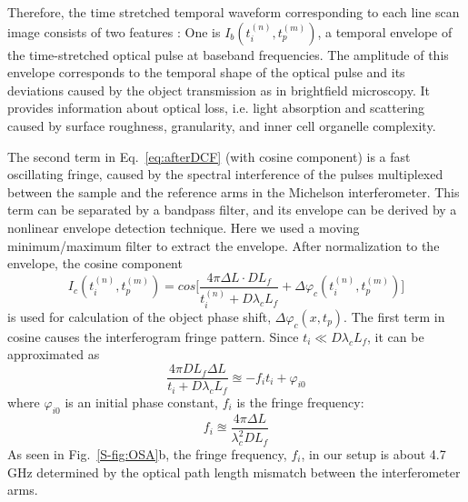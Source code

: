 \documentclass[aps,pra,reprint,longbibliography,superscriptaddress]{revtex4-1}
\begin{document}
Therefore, the time stretched temporal waveform corresponding to each line scan image consists of two features \cite{mahjoubfar2014label}: One is $I_b (t_i^{(n)}, t_p^{(m)})$, a temporal envelope of the time-stretched optical pulse at baseband frequencies. The amplitude of this envelope corresponds to the temporal shape of the optical pulse and its deviations caused by the object transmission as in brightfield microscopy. It provides information about optical loss, i.e. light absorption and scattering caused by surface roughness, granularity, and inner cell organelle complexity. 

The second term in Eq.~\ref{eq:afterDCF} (with cosine component) is a fast oscillating fringe, caused by the spectral interference of the pulses multiplexed between the sample and the reference arms in the Michelson interferometer. This term can be separated by a bandpass filter, and its envelope can be derived by a nonlinear envelope detection technique. Here we used a moving minimum/maximum filter to extract the envelope. After normalization to the envelope, the cosine component 
\begin{equation}
I_c (t_i^{(n)}, t_p^{(m)}) = cos\Bigg[ \frac{4\pi\Delta L \cdot D L_f}{t_i^{(n)} + D\lambda_c L_f} + \Delta \varphi_c(t_i^{(n)}, t_p^{(m)}) \Bigg]
\end{equation}
is used for calculation of the object phase shift, $\Delta\varphi_c(x,t_p)$. The first term in cosine causes the interferogram fringe pattern. Since $t_i \ll D \lambda_c L_f$, it can be approximated as
\begin{equation}
\frac{4\pi D L_f \Delta L}{t_i + D \lambda_c L_f} \approxeq - f_i t_i + \varphi_{i0}
\end{equation}
where $\varphi_{i0}$ is an initial phase constant, $f_i$ is the fringe frequency:
\begin{equation}
f_i \approxeq \frac{4\pi \Delta L}{\lambda_c^2 D L_f}
\end{equation}
As seen in Fig.~\ref{S-fig:OSA}b, the fringe frequency, $f_i$, in our setup is about 4.7 GHz determined by the optical path length mismatch between the interferometer arms.
\end{document}
